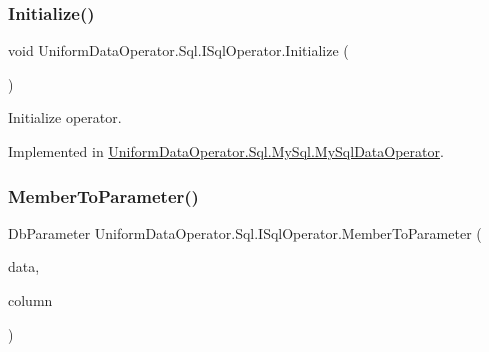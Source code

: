 \mbox{\label{interface_uniform_data_operator_1_1_sql_1_1_i_sql_operator_a590fa080f8c35ebf5ee6ac535545e2a8}} 
\subsubsection{\texorpdfstring{Initialize()}{Initialize()}}
{\footnotesize\ttfamily void Uniform\+Data\+Operator.\+Sql.\+I\+Sql\+Operator.\+Initialize (\begin{DoxyParamCaption}{ }\end{DoxyParamCaption})}



Initialize operator. 



Implemented in \mbox{\hyperlink{class_uniform_data_operator_1_1_sql_1_1_my_sql_1_1_my_sql_data_operator_a5aad834d2ceba598037b6ed19b27db6d}{Uniform\+Data\+Operator.\+Sql.\+My\+Sql.\+My\+Sql\+Data\+Operator}}.

\mbox{\label{interface_uniform_data_operator_1_1_sql_1_1_i_sql_operator_ac09f73e97974a4bd697046e0c54a93d3}} 
\subsubsection{\texorpdfstring{Member\+To\+Parameter()}{MemberToParameter()}}
{\footnotesize\ttfamily Db\+Parameter Uniform\+Data\+Operator.\+Sql.\+I\+Sql\+Operator.\+Member\+To\+Parameter (\begin{DoxyParamCaption}\item[{object}]{data,  }\item[{\mbox{\hyperlink{class_uniform_data_operator_1_1_sql_1_1_markup_1_1_column_attribute}{Column\+Attribute}}}]{column }\end{DoxyParamCaption})}



